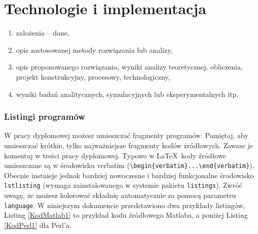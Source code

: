 \documentclass[12pt,twoside]{article}
\begin{document}
\clearpage	

\section{Technologie i implementacja}

























\begin{enumerate}[label=\alph*), leftmargin=1.25cm] 
	\item założenia – dane,
	\item opis zastosowanej metody rozwiązania lub analizy,
	\item opis proponowanego rozwiązania, wyniki analizy teoretycznej, obliczenia, projekt konstrukcyjny, procesowy, technologiczny,
	\item wyniki badań analitycznych, symulacyjnych lub eksperymentalnych itp.
\end{enumerate}





{\subsubsection{Listingi programów}}

W pracy dyplomowej możesz umieszczać fragmenty programów. Pamiętaj, aby umieszczać krótkie, tylko najważniejsze fragmenty kodów źródłowych. Zawsze je komentuj w treści
pracy dyplomowej. Typowo w \LaTeX\ kody źródłowe umieszczane są w środowisku verbatim (\verb|\begin{verbatim}...\end{verbatim}|). Obecnie instnieje jednak bardziej nowoczesne i bardziej funkcjonalne środowisko \verb|lstlisting| (wymaga zainstalowanego w systemie pakietu \verb|listings|). Zwróć uwagę, że możesz kolorować składnię
automatycznie za pomocą parametru \verb|language|. W niniejszym dokumencie przedstawiono dwa przykłady listingów, Listing \ref{KodMatlab1} to przykład kodu źródłowego Matlaba, a poniżej Listing \ref{KodPerl1} dla Perl'a.\\
\end{document}
